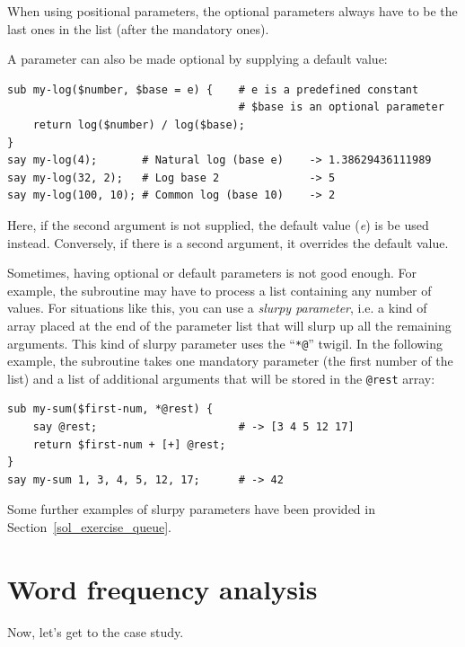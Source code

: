 When using positional parameters, the optional parameters 
always have to be the last ones in the list (after the 
mandatory ones).

A parameter can also be made optional by supplying a default 
value:

\begin{verbatim}
sub my-log($number, $base = e) {    # e is a predefined constant
                                    # $base is an optional parameter
    return log($number) / log($base);
}
say my-log(4);       # Natural log (base e)    -> 1.38629436111989
say my-log(32, 2);   # Log base 2              -> 5
say my-log(100, 10); # Common log (base 10)    -> 2
\end{verbatim}

Here, if the second argument is not supplied, the default 
value (\emph{e}) is be used instead. Conversely, if there 
is a second argument, it overrides the default value.

\label{slurpy_parameters}
Sometimes, having optional or default parameters is not good 
enough. For example, the subroutine may have to process a list 
containing any number of values. For situations like this, 
you can use a \emph{slurpy parameter}, i.e. a kind of array 
placed at the end of the parameter list that will slurp up 
all the remaining arguments. This kind of slurpy parameter 
uses the ``\verb"*@"'' twigil. In the following example, 
the subroutine takes one mandatory parameter (the first 
number of the list) and a list of additional arguments 
that will be stored in the \verb'@rest' array:

\begin{verbatim}
sub my-sum($first-num, *@rest) {
    say @rest;                      # -> [3 4 5 12 17]
    return $first-num + [+] @rest;
}
say my-sum 1, 3, 4, 5, 12, 17;      # -> 42 
\end{verbatim}

Some further examples of slurpy parameters have been 
provided in Section~\ref{sol_exercise_queue}.

\section{Word frequency analysis}
\label{analysis}

Now, let's get to the case study.

